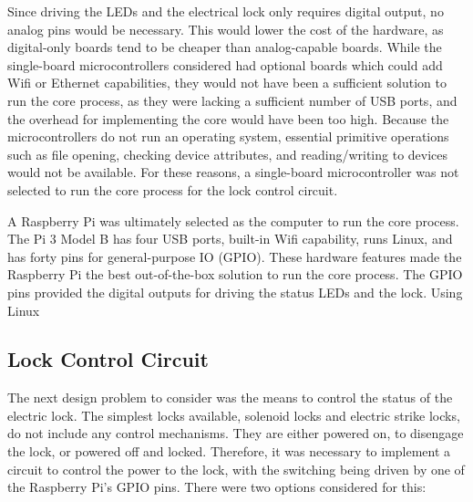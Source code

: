 \documentclass[12pt]{report}
\let\Oldsubsection\subsection
\renewcommand{\subsection}{\FloatBarrier\Oldsubsection}
\begin{document}
Since driving the LEDs and the electrical lock only requires digital output, no analog pins would be necessary. This 
would lower the cost of the hardware, as digital-only boards tend to be cheaper than analog-capable boards. While 
the single-board microcontrollers considered had optional boards which could add Wifi or Ethernet capabilities, they 
would not have been a sufficient solution to run the core process, as they were lacking a sufficient number of USB 
ports, and the overhead for implementing the core would have been too high. Because the microcontrollers do not run an 
operating system, essential primitive operations such as file opening, checking device attributes, and reading/writing
to devices would not be available. For these reasons, a single-board microcontroller was not selected to run the core 
process for the lock control circuit.

A Raspberry Pi was ultimately selected as the computer to run the core process. The Pi 3 Model B has four USB ports, 
built-in Wifi capability, runs Linux, and has forty pins for general-purpose IO (GPIO). These hardware features made the
Raspberry Pi the best out-of-the-box solution to run the core process. The GPIO pins provided the digital outputs for 
driving the status LEDs and the lock. Using Linux 

\subsection{Lock Control Circuit} \label{lock-control-circuit}

The next design problem to consider was the means to control the status of the electric lock. The simplest locks 
available, solenoid locks and electric strike locks, do not include any control mechanisms. They are either powered on, 
to disengage the lock, or powered off and locked. Therefore, it was necessary to implement a circuit to control the
power to the lock, with the switching being driven by one of the Raspberry Pi's GPIO pins. There were two options
considered for this:
\end{document}
